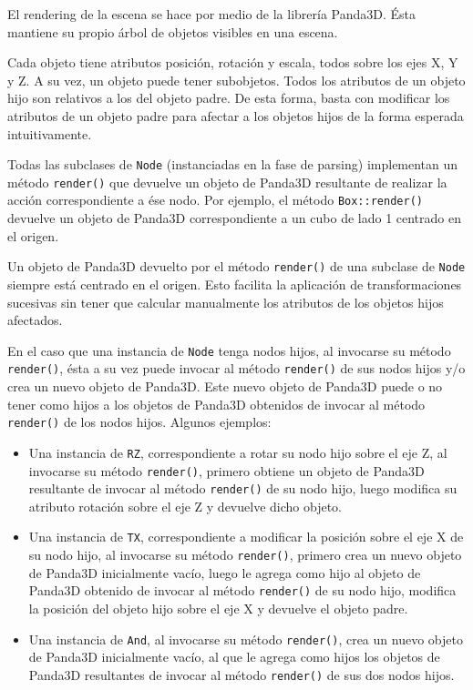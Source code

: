 \documentclass[a4paper, 10pt, twoside]{article}
\begin{document}
El rendering de la escena se hace por medio de la librería Panda3D. Ésta mantiene su propio árbol de objetos visibles en una escena.

Cada objeto tiene atributos posición, rotación y escala, todos sobre los ejes X, Y y Z. A su vez, un objeto puede tener subobjetos. Todos los atributos de un objeto hijo son relativos a los del objeto padre. De esta forma, basta con modificar los atributos de un objeto padre para afectar a los objetos hijos de la forma esperada intuitivamente.

Todas las subclases de \texttt{Node} (instanciadas en la fase de parsing) implementan un método \texttt{render()} que devuelve un objeto de Panda3D resultante de realizar la acción correspondiente a ése nodo. Por ejemplo, el método \texttt{Box::render()} devuelve un objeto de Panda3D correspondiente a un cubo de lado 1 centrado en el origen.

Un objeto de Panda3D devuelto por el método \texttt{render()} de una subclase de \texttt{Node} siempre está centrado en el origen. Esto facilita la aplicación de transformaciones sucesivas sin tener que calcular manualmente los atributos de los objetos hijos afectados.

En el caso que una instancia de \texttt{Node} tenga nodos hijos, al invocarse su método \texttt{render()}, ésta a su vez puede invocar al método \texttt{render()} de sus nodos hijos y/o crea un nuevo objeto de Panda3D. Este nuevo objeto de Panda3D puede o no tener como hijos a los objetos de Panda3D obtenidos de invocar al método \texttt{render()} de los nodos hijos. Algunos ejemplos:

\begin{itemize}
  \item Una instancia de \texttt{RZ}, correspondiente a rotar su nodo hijo sobre el eje Z, al invocarse su método \texttt{render()}, primero obtiene un objeto de Panda3D resultante de invocar al método \texttt{render()} de su nodo hijo, luego modifica su atributo rotación sobre el eje Z y devuelve dicho objeto.

  \item Una instancia de \texttt{TX}, correspondiente a modificar la posición sobre el eje X de su nodo hijo, al invocarse su método \texttt{render()}, primero crea un nuevo objeto de Panda3D inicialmente vacío, luego le agrega como hijo al objeto de Panda3D obtenido de invocar al método \texttt{render()} de su nodo hijo, modifica la posición del objeto hijo sobre el eje X y devuelve el objeto padre.

  \item Una instancia de \texttt{And}, al invocarse su método \texttt{render()}, crea un nuevo objeto de Panda3D inicialmente vacío, al que le agrega como hijos los objetos de Panda3D resultantes de invocar al método \texttt{render()} de sus dos nodos hijos.
\end{itemize}
\end{document}

